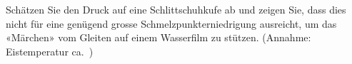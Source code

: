 Schätzen Sie den Druck auf eine Schlittschuhkufe ab und zeigen Sie, dass dies nicht für eine genügend grosse Schmelzpunkterniedrigung ausreicht, um das «Märchen» vom Gleiten auf einem Wasserfilm zu stützen. (Annahme: Eistemperatur ca.~\TEisO)
